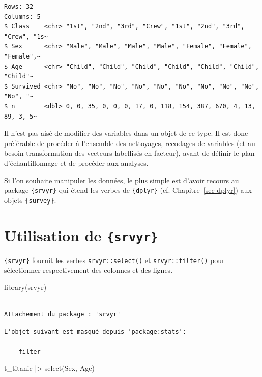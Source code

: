\documentclass[
  letterpaper,
  DIV=11,
  numbers=noendperiod,
  oneside]{scrreprt}
\newenvironment{Shaded}{\begin{snugshade}}{\end{snugshade}}
\newcommand{\FunctionTok}[1]{\textcolor[rgb]{0.28,0.35,0.67}{#1}}
\newcommand{\NormalTok}[1]{\textcolor[rgb]{0.00,0.23,0.31}{#1}}
\newcommand{\SpecialCharTok}[1]{\textcolor[rgb]{0.37,0.37,0.37}{#1}}
\begin{document}
\begin{verbatim}
Rows: 32
Columns: 5
$ Class    <chr> "1st", "2nd", "3rd", "Crew", "1st", "2nd", "3rd", "Crew", "1s~
$ Sex      <chr> "Male", "Male", "Male", "Male", "Female", "Female", "Female",~
$ Age      <chr> "Child", "Child", "Child", "Child", "Child", "Child", "Child"~
$ Survived <chr> "No", "No", "No", "No", "No", "No", "No", "No", "No", "No", "~
$ n        <dbl> 0, 0, 35, 0, 0, 0, 17, 0, 118, 154, 387, 670, 4, 13, 89, 3, 5~
\end{verbatim}

Il n'est pas aisé de modifier des variables dans un objet de ce type. Il
est donc préférable de procéder à l'ensemble des nettoyages, recodages
de variables (et au besoin transformation des vecteurs labellisés en
facteur), avant de définir le plan d'échantillonnage et de procéder aux
analyses.

Si l'on souhaite manipuler les données, le plus simple est d'avoir
recours au package \texttt{\{srvyr\}} qui étend les verbes de
\texttt{\{dplyr\}} (cf. Chapitre~\ref{sec-dplyr}) aux objets
\texttt{\{survey\}}.

\hypertarget{utilisation-de-srvyr}{%
\section{\texorpdfstring{Utilisation de
\texttt{\{srvyr\}}}{Utilisation de \{srvyr\}}}\label{utilisation-de-srvyr}}

\texttt{\{srvyr\}} fournit les verbes \texttt{srvyr::select()} et
\texttt{srvyr::filter()} pour sélectionner respectivement des colonnes
et des lignes.

\begin{Shaded}
\begin{Highlighting}[]
\FunctionTok{library}\NormalTok{(srvyr)}
\end{Highlighting}
\end{Shaded}

\begin{verbatim}

Attachement du package : 'srvyr'
\end{verbatim}

\begin{verbatim}
L'objet suivant est masqué depuis 'package:stats':

    filter
\end{verbatim}

\begin{Shaded}
\begin{Highlighting}[]
\NormalTok{t\_titanic }\SpecialCharTok{|\textgreater{}} \FunctionTok{select}\NormalTok{(Sex, Age)}
\end{Highlighting}
\end{Shaded}
\end{document}
